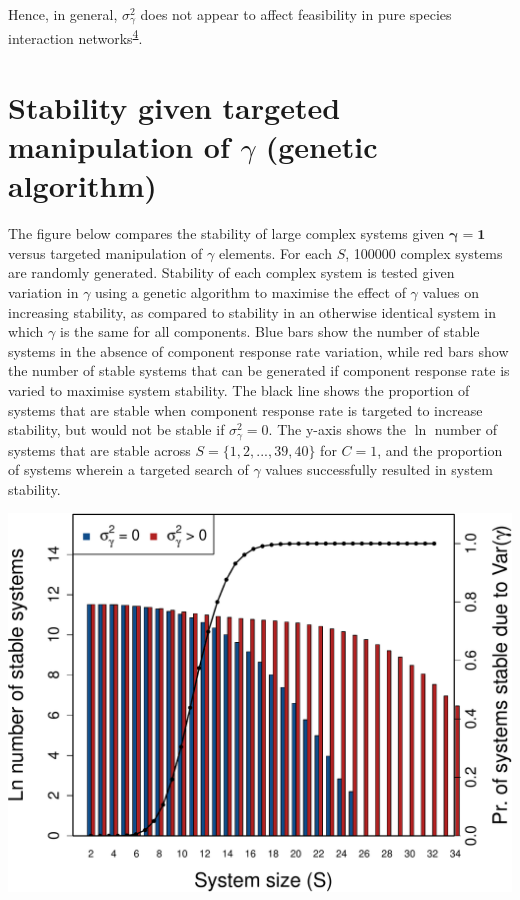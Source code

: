 \documentclass[]{article}
\begin{document}
Hence, in general, \(\sigma^{2}_{\gamma}\) does not appear to affect
feasibility in pure species interaction
networks\textsuperscript{\protect\hyperlink{ref-Servan2018}{4}}.

\hypertarget{ga}{\section{\texorpdfstring{Stability given targeted
manipulation of \(\gamma\) (genetic
algorithm)}{Stability given targeted manipulation of \textbackslash{}gamma (genetic algorithm)}}\label{ga}}

The figure below compares the stability of large complex systems given
\(\boldsymbol{\gamma = 1}\) versus targeted manipulation of \(\gamma\)
elements. For each \(S\), 100000 complex systems are randomly generated.
Stability of each complex system is tested given variation in \(\gamma\)
using a genetic algorithm to maximise the effect of \(\gamma\) values on
increasing stability, as compared to stability in an otherwise identical
system in which \(\gamma\) is the same for all components. Blue bars
show the number of stable systems in the absence of component response
rate variation, while red bars show the number of stable systems that
can be generated if component response rate is varied to maximise system
stability. The black line shows the proportion of systems that are
stable when component response rate is targeted to increase stability,
but would not be stable if \(\sigma^{2}_{\gamma} = 0\). The y-axis shows
the \(\ln\) number of systems that are stable across
\(S = \{1, 2, ..., 39, 40\}\) for \(C = 1\), and the proportion of
systems wherein a targeted search of \(\gamma\) values successfully
resulted in system stability.

\includegraphics{SI_files/figure-latex/unnamed-chunk-30-1.pdf}
\end{document}
